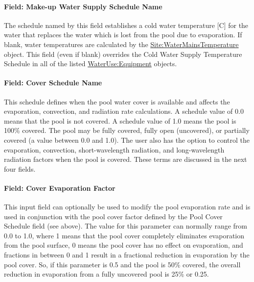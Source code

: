 \paragraph{Field: Make-up Water Supply Schedule Name}\label{field-make-up-water-supply-schedule-name}

The schedule named by this field establishes a cold water temperature {[}C{]} for the water that replaces the water which is lost from the pool due to evaporation. If blank, water temperatures are calculated by the \hyperref[sitewatermainstemperature]{Site:WaterMainsTemperature} object. This field (even if blank) overrides the Cold Water Supply Temperature Schedule in all of the listed \hyperref[wateruseequipment]{WaterUse:Equipment} objects.

\paragraph{Field: Cover Schedule Name}\label{field-cover-schedule-name}

This schedule defines when the pool water cover is available and affects the evaporation, convection, and radiation rate calculations. A schedule value of 0.0 means that the pool is not covered. A schedule value of 1.0 means the pool is 100\% covered. The pool may be fully covered, fully open (uncovered), or partially covered (a value between 0.0 and 1.0). The user also has the option to control the evaporation, convection, short-wavelength radiation, and long-wavelength radiation factors when the pool is covered. These terms are discussed in the next four fields.

\paragraph{Field: Cover Evaporation Factor}\label{field-cover-evaporation-factor}

This input field can optionally be used to modify the pool evaporation rate and is used in conjunction with the pool cover factor defined by the Pool Cover Schedule field (see above). The value for this parameter can normally range from 0.0 to 1.0, where 1 means that the pool cover completely eliminates evaporation from the pool surface, 0 means the pool cover has no effect on evaporation, and fractions in between 0 and 1 result in a fractional reduction in evaporation by the pool cover. So, if this parameter is 0.5 and the pool is 50\% covered, the overall reduction in evaporation from a fully uncovered pool is 25\% or 0.25.

